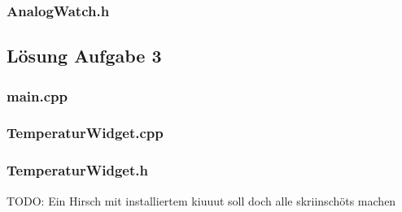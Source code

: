 \subsubsection{AnalogWatch.h}


\subsection{Lösung Aufgabe 3}
\subsubsection{main.cpp}

\subsubsection{TemperaturWidget.cpp}

\subsubsection{TemperaturWidget.h}



TODO: Ein Hirsch mit installiertem kiuuut soll doch alle skriinschöts machen

